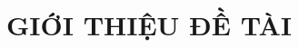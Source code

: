 \documentclass[a4paper,13pt,3p,twoside]{report} %
\theoremstyle{definition}
\begin{document}
\tableofcontents 
\thispagestyle{empty}

\renewcommand{\listfigurename}{DANH MỤC HÌNH VẼ}
{\let\oldnumberline\numberline
\renewcommand{\numberline}{Hình~\oldnumberline}
\listoffigures} 
\newpage


\renewcommand{\listtablename}{DANH MỤC BẢNG BIỂU}
{\let\oldnumberline\numberline
\renewcommand{\numberline}{Bảng~\oldnumberline}
\listoftables}

\glsaddall
\printglossary[title={Custom 3-Column Glossary}]




\renewcommand*{\glossaryname}{Danh sách thuật ngữ}
\renewcommand*{\acronymname}{DANH MỤC THUẬT NGỮ}
\renewcommand*{\entryname}{Thuật ngữ}
\renewcommand*{\descriptionname}{Ý nghĩa}
\printnoidxglossaries

\cleardoublepage

%

%


\newpage
{}


\pagestyle{fancy}
\fancyhf{}
\fancyhead[RO, LE]{\leftmark} %
\fancyfoot[RO, LE]{\thepage}

\chapter{GIỚI THIỆU ĐỀ TÀI}
\label{chapter:Introduction}

%
\end{document}
